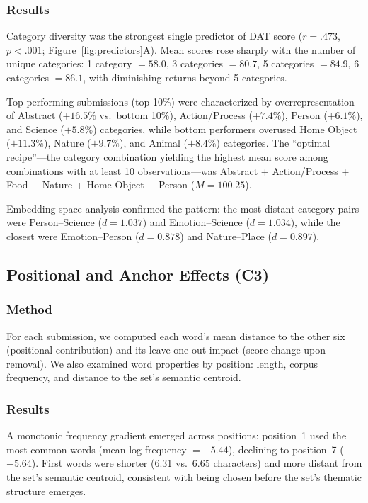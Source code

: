 \documentclass[12pt]{article}
\begin{document}
\subsubsection{Results}

Category diversity was the strongest single predictor of DAT score ($r = .473$, $p < .001$; Figure~\ref{fig:predictors}A). Mean scores rose sharply with the number of unique categories: 1 category $= 58.0$, 3 categories $= 80.7$, 5 categories $= 84.9$, 6 categories $= 86.1$, with diminishing returns beyond 5 categories.

Top-performing submissions (top 10\%) were characterized by overrepresentation of Abstract ($+16.5\%$ vs.\ bottom 10\%), Action/Process ($+7.4\%$), Person ($+6.1\%$), and Science ($+5.8\%$) categories, while bottom performers overused Home Object ($+11.3\%$), Nature ($+9.7\%$), and Animal ($+8.4\%$) categories. The ``optimal recipe''---the category combination yielding the highest mean score among combinations with at least 10 observations---was Abstract + Action/Process + Food + Nature + Home Object + Person ($M = 100.25$).

Embedding-space analysis confirmed the pattern: the most distant category pairs were Person--Science ($d = 1.037$) and Emotion--Science ($d = 1.034$), while the closest were Emotion--Person ($d = 0.878$) and Nature--Place ($d = 0.897$).

\subsection{Positional and Anchor Effects (C3)}

\subsubsection{Method}

For each submission, we computed each word's mean distance to the other six (positional contribution) and its leave-one-out impact (score change upon removal). We also examined word properties by position: length, corpus frequency, and distance to the set's semantic centroid.

\subsubsection{Results}

A monotonic frequency gradient emerged across positions: position~1 used the most common words (mean log frequency $= -5.44$), declining to position~7 ($-5.64$). First words were shorter (6.31 vs.\ 6.65 characters) and more distant from the set's semantic centroid, consistent with being chosen before the set's thematic structure emerges.
\end{document}
